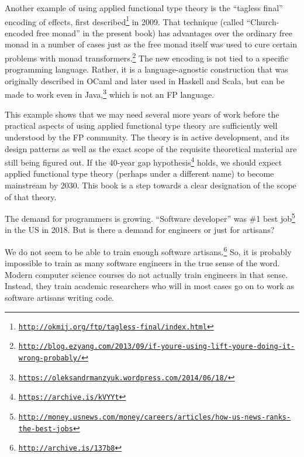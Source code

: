 Another example of using applied functional type theory is the  \textsf{``}tagless
final\textsf{''} encoding of effects, first described\footnote{\texttt{\href{http://okmij.org/ftp/tagless-final/index.html}{http://okmij.org/ftp/tagless-final/index.html}}}
in 2009. That technique (called \textsf{``}Church-encoded free monad\textsf{''}
in the present book) has advantages over the ordinary free monad in
a number of cases \textemdash{} just as the free monad itself was
used to cure certain problems with monad transformers.\footnote{\texttt{\href{http://blog.ezyang.com/2013/09/if-youre-using-lift-youre-doing-it-wrong-probably/}{http://blog.ezyang.com/2013/09/if-youre-using-lift-youre-doing-it-wrong-probably/}}}
The new encoding is not tied to a specific programming language. Rather,
it is a language-agnostic construction that was originally described
in OCaml and later used in Haskell and Scala, but can be made to work
even in Java,\footnote{\texttt{\href{https://oleksandrmanzyuk.wordpress.com/2014/06/18/}{https://oleksandrmanzyuk.wordpress.com/2014/06/18/}}}
which is not an FP language.

This example shows that we may need several more years of work before
the practical aspects of using applied functional type theory are
sufficiently well understood by the FP community. The theory is in
active development, and its design patterns \textemdash{} as well
as the exact scope of the requisite theoretical material \textemdash{}
are still being figured out. If the 40-year gap hypothesis\footnote{\texttt{\href{https://www.linkedin.com/pulse/40-year-gap-what-has-academic-computer-science-ever-done-winitzki}{https://archive.is/kVYYt}}}
holds, we should expect applied functional type theory (perhaps under
a different name) to become mainstream by 2030. This book is a step
towards a clear designation of the scope of that theory.


The demand for programmers is growing. \textsf{``}Software developer\textsf{''} was
\#1 best job\footnote{\texttt{\href{http://money.usnews.com/money/careers/articles/how-us-news-ranks-the-best-jobs}{http://money.usnews.com/money/careers/articles/how-us-news-ranks-the-best-jobs}}}
in the US in 2018. But is there a demand for engineers or just for
artisans?

We do not seem to be able to train enough software artisans.\footnote{\texttt{\href{http://archive.is/137b8}{http://archive.is/137b8}}}
So, it is probably impossible to train as many software engineers
in the true sense of the word. Modern computer science courses do
not actually train engineers in that sense. Instead, they train academic
researchers who will in most cases go on to work as software artisans
writing code.

